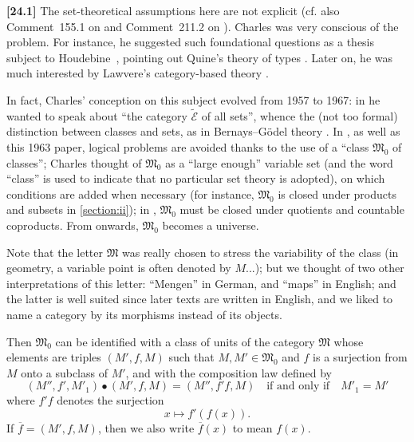 \documentclass[a4paper,fleqn]{article}
\theoremstyle{plain}
\theoremstyle{definition}
\newenvironment{longcomm}[1]
  {\noindent\textbf{[#1]}\rmfamily}
  {}
\newcommand{\MM}{\mathfrak{M}}
\begin{document}
\begin{longcomm}{24.1}
  The set-theoretical assumptions here are not explicit (cf. also Comment~155.1 on \cite{coll66} and Comment~211.2 on \cite{coll100}).
  Charles was very conscious of the problem.
  For instance, he suggested such foundational questions as a thesis subject to Houdebine~\cite{comm55}, pointing out Quine's theory of types \cite{comm87}.
  Later on, he was much interested by Lawvere's category-based theory \cite{comm64}.

  In fact, Charles' conception on this subject evolved from 1957 to 1967: in \cite{coll47} he wanted to speak about ``the category $\widetilde{\mathcal{E}}$ of all sets'', whence the (not too formal) distinction between classes and sets, as in Bernays--Gödel theory \cite{comm10}.
  In \cite{coll55}, as well as this 1963 paper, logical problems are avoided thanks to the use of a ``class $\MM_0$ of classes'';
  Charles thought of $\MM_0$ as a ``large enough'' variable set (and the word ``class'' is used to indicate that no particular set theory is adopted), on which conditions are added when necessary (for instance, $\MM_0$ is closed under products and subsets in \cref{section:ii});
  in \cite{coll66,coll100}, $\MM_0$ must be closed under quotients and countable coproducts.
  From \cite{coll109} onwards, $\MM_0$ becomes a universe.

  Note that the letter $\MM$ was really chosen to stress the variability of the class (in geometry, a variable point is often denoted by $M$...);
  but we thought of two other interpretations of this letter: ``Mengen'' in German, and ``maps'' in English;
  and the latter is well suited since later texts are written in English, and we liked to name a category by its morphisms instead of its objects.
\end{longcomm}

Then $\MM_0$ can be identified with a class of units of the category $\MM$ whose elements are triples $(M',f,M)$ such that $M,M'\in\MM_0$ and $f$ is a surjection from $M$ onto a subclass of $M'$, and with the composition law defined by
\[
  (M'',f',M'_1)\bullet(M',f,M)
  = (M'',f'f,M)
  \quad\text{if and only if}\quad
  M'_1=M'
\]
where $f'f$ denotes the surjection
\[
  x\longmapsto f'(f(x)).
\]
If $\overline{f}=(M',f,M)$, then we also write $\overline{f}(x)$ to mean $f(x)$.
\end{document}

